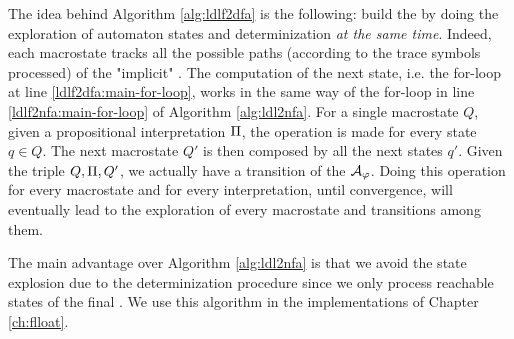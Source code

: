 The idea behind Algorithm \ref{alg:ldlf2dfa} is the following: build the \DFA by doing the exploration of automaton states and determinization \emph{at the same time}. Indeed, each macrostate tracks all the possible paths (according to the trace symbols processed) of the "implicit" \NFA. The computation of the next \NFA state, i.e. the for-loop at line \ref{ldlf2dfa:main-for-loop}, works in the same way of the for-loop in line \ref{ldlf2nfa:main-for-loop} of Algorithm \ref{alg:ldl2nfa}. For a single macrostate $Q$, given a propositional interpretation $\Pi$, the operation is made for every \NFA state $q\in Q$. The next macrostate $Q'$ is then composed by all the next \NFA states $q'$. Given the triple $Q, \Pi, Q'$, we actually have a transition of the \DFA $\mathcal{A}_\varphi$. Doing this operation for every macrostate and for every interpretation, until convergence, will eventually lead to the exploration of every macrostate and transitions among them. 

The main advantage over Algorithm \ref{alg:ldl2nfa} is that we avoid the state explosion due to the determinization procedure since we only process reachable states of the final \DFA. We use this algorithm in the implementations of Chapter \ref{ch:flloat}.

